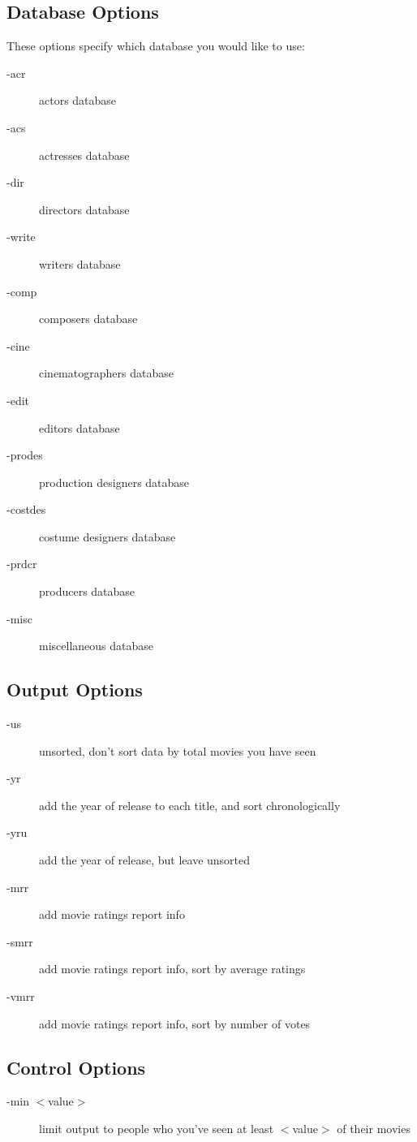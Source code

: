 \subsection{Database Options}

These options specify which database you would like to use:
\begin{description}
\item[-acr] actors database
\item[-acs] actresses database
\item[-dir] directors database
\item[-write] writers database
\item[-comp] composers database
\item[-cine] cinematographers database
\item[-edit] editors database
\item[-prodes] production designers database
\item[-costdes] costume designers database
\item[-prdcr] producers database
\item[-misc] miscellaneous database
\end{description}

\subsection{Output Options}

\begin{description}
\item[-us] unsorted, don't sort data by total movies you have seen
\item[-yr] add the year of release to each title, and sort chronologically
\item[-yru] add the year of release, but leave unsorted
\item[-mrr] add movie ratings report info
\item[-smrr] add movie ratings report info, sort by average ratings
\item[-vmrr] add movie ratings report info, sort by number of votes
\end{description}

\subsection{Control Options}

\begin{description}
\item[-min $<$value$>$] limit output to people who you've seen at least 
$<$value$>$ of their movies
\end{description}

